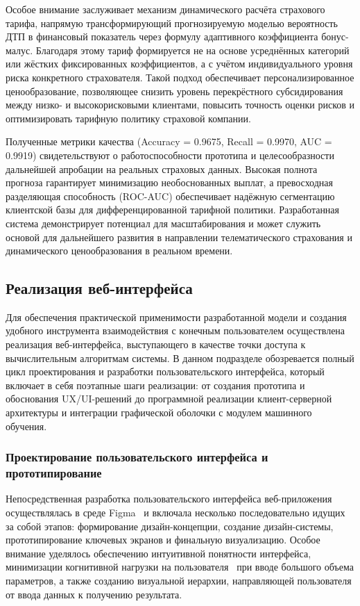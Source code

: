 Особое внимание заслуживает механизм динамического расчёта страхового тарифа, напрямую трансформирующий прогнозируемую моделью вероятность ДТП в финансовый показатель через формулу адаптивного коэффициента бонус-малус. Благодаря этому тариф формируется не на основе усреднённых категорий или жёстких фиксированных коэффициентов, а с учётом индивидуального уровня риска конкретного страхователя. Такой подход обеспечивает персонализированное ценообразование, позволяющее снизить уровень перекрёстного субсидирования между низко- и высокорисковыми клиентами, повысить точность оценки рисков и оптимизировать тарифную политику страховой компании.

Полученные метрики качества (Accuracy = 0.9675, Recall = 0.9970, AUC = 0.9919) свидетельствуют о работоспособности прототипа и целесообразности дальнейшей апробации на реальных страховых данных. Высокая полнота прогноза гарантирует минимизацию необоснованных выплат, а превосходная разделяющая способность (ROC-AUC) обеспечивает надёжную сегментацию клиентской базы для дифференцированной тарифной политики. Разработанная система демонстрирует потенциал для масштабирования и может служить основой для дальнейшего развития в направлении телематического страхования и динамического ценообразования в реальном времени.

\subsection{Реализация веб-интерфейса}

Для обеспечения практической применимости разработанной модели и создания удобного инструмента взаимодействия с конечным пользователем осуществлена реализация веб-интерфейса, выступающего в качестве точки доступа к вычислительным алгоритмам системы. В данном подразделе обозревается полный цикл проектирования и разработки пользовательского интерфейса, который включает в себя поэтапные шаги реализации: от создания прототипа и обоснования UX/UI-решений до программной реализации клиент-серверной архитектуры и интеграции графической оболочки с модулем машинного обучения.

\subsubsection{Проектирование пользовательского интерфейса и прототипирование}

Непосредственная разработка пользовательского интерфейса веб-приложения осуществлялась в среде Figma~\cite{figma2026learn} и включала несколько последовательно идущих за собой этапов: формирование дизайн-концепции, создание дизайн-системы, прототипирование ключевых экранов и финальную визуализацию. Особое внимание уделялось обеспечению интуитивной понятности интерфейса, минимизации когнитивной нагрузки на пользователя~\cite{krug2014dont} при вводе большого объема параметров, а также созданию визуальной иерархии, направляющей пользователя от ввода данных к получению результата.

